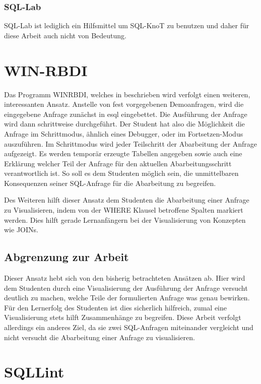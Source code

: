 \subsubsection{SQL-Lab}

SQL-Lab ist lediglich ein Hilfsmittel um SQL-KnoT zu benutzen und daher für diese Arbeit auch nicht von Bedeutung. 

\section{WIN-RBDI}

Das Programm WINRBDI, welches in \cite{winrbdi1} beschrieben wird verfolgt einen weiteren, interessanten Ansatz. Anstelle von fest vorgegebenen Demoanfragen, wird die eingegebene Anfrage zunächst in esql eingebettet. Die Ausführung der Anfrage wird dann schrittweise durchgeführt. Der Student hat also die Möglichkeit die Anfrage im Schrittmodus, ähnlich eines Debugger, oder im Fortsetzen-Modus auszuführen. Im Schrittmodus wird jeder Teilschritt der Abarbeitung der Anfrage aufgezeigt. Es werden temporär erzeugte Tabellen angegeben sowie auch eine Erklärung welcher Teil der Anfrage für den aktuellen Abarbeitungsschritt verantwortlich ist. So soll es dem Studenten möglich sein, die unmittelbaren Konsequenzen seiner SQL-Anfrage für die Abarbeitung zu begreifen. 

Des Weiteren hilft dieser Ansatz dem Studenten die Abarbeitung einer Anfrage zu Visualisieren, indem von der WHERE Klausel betroffene Spalten markiert werden. Dies hilft gerade Lernanfängern bei der Visualisierung von Konzepten wie JOINs.

\subsection*{Abgrenzung zur Arbeit}

Dieser Ansatz hebt sich von den bisherig betrachteten Ansätzen ab. Hier wird dem Studenten durch eine Visualisierung der Ausführung der Anfrage versucht deutlich zu machen, welche Teile der formulierten Anfrage was genau bewirken. Für den Lernerfolg des Studenten ist dies sicherlich hilfreich, zumal eine Visualisierung stets hilft Zusammenhänge zu begreifen. Diese Arbeit verfolgt allerdings ein anderes Ziel, da sie zwei SQL-Anfragen miteinander vergleicht und nicht versucht die Abarbeitung einer Anfrage zu visualisieren.

\section{SQLLint}

